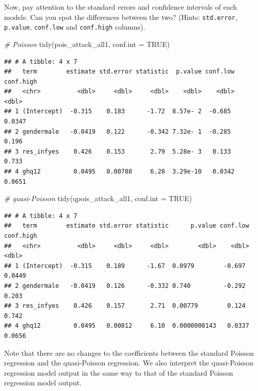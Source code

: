\documentclass[
  10pt,
]{krantz}
\newenvironment{Shaded}{\begin{snugshade}}{\end{snugshade}}
\newcommand{\AttributeTok}[1]{\textcolor[rgb]{0.77,0.63,0.00}{#1}}
\newcommand{\CommentTok}[1]{\textcolor[rgb]{0.56,0.35,0.01}{\textit{#1}}}
\newcommand{\ConstantTok}[1]{\textcolor[rgb]{0.00,0.00,0.00}{#1}}
\newcommand{\FunctionTok}[1]{\textcolor[rgb]{0.00,0.00,0.00}{#1}}
\newcommand{\NormalTok}[1]{#1}
\begin{document}
Now, pay attention to the standard errors and confidence intervals of each models. Can you spot the differences between the two? (Hints: \texttt{std.error}, \texttt{p.value}, \texttt{conf.low} and \texttt{conf.high} columns).

\begin{Shaded}
\begin{Highlighting}[]
\CommentTok{\# Poisson}
\FunctionTok{tidy}\NormalTok{(pois\_attack\_all1, }\AttributeTok{conf.int =} \ConstantTok{TRUE}\NormalTok{)}
\end{Highlighting}
\end{Shaded}

\begin{verbatim}
## # A tibble: 4 x 7
##   term        estimate std.error statistic  p.value conf.low conf.high
##   <chr>          <dbl>     <dbl>     <dbl>    <dbl>    <dbl>     <dbl>
## 1 (Intercept)  -0.315    0.183      -1.72  8.57e- 2  -0.685     0.0347
## 2 gendermale   -0.0419   0.122      -0.342 7.32e- 1  -0.285     0.196 
## 3 res_infyes    0.426    0.153       2.79  5.28e- 3   0.133     0.733 
## 4 ghq12         0.0495   0.00788     6.28  3.29e-10   0.0342    0.0651
\end{verbatim}

\begin{Shaded}
\begin{Highlighting}[]
\CommentTok{\# quasi{-}Poisson}
\FunctionTok{tidy}\NormalTok{(qpois\_attack\_all1, }\AttributeTok{conf.int =} \ConstantTok{TRUE}\NormalTok{)  }
\end{Highlighting}
\end{Shaded}

\begin{verbatim}
## # A tibble: 4 x 7
##   term        estimate std.error statistic      p.value conf.low conf.high
##   <chr>          <dbl>     <dbl>     <dbl>        <dbl>    <dbl>     <dbl>
## 1 (Intercept)  -0.315    0.189      -1.67  0.0979        -0.697     0.0449
## 2 gendermale   -0.0419   0.126      -0.332 0.740         -0.292     0.203 
## 3 res_infyes    0.426    0.157       2.71  0.00779        0.124     0.742 
## 4 ghq12         0.0495   0.00812     6.10  0.0000000143   0.0337    0.0656
\end{verbatim}

Note that there are no changes to the coefficients between the standard Poisson regression and the quasi-Poisson regression. We also interpret the quasi-Poisson regression model output in the same way to that of the standard Poisson regression model output.
\end{document}
